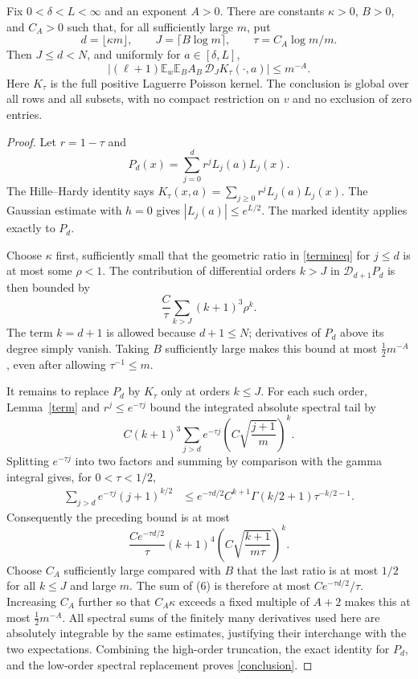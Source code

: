 \documentclass[11pt]{article}
\newcommand{\E}{\mathbb E}
\begin{document}
\begin{theorem}\label{truncation}
Fix $0<\delta<L<\infty$ and an exponent $A>0$.
There are constants $\kappa>0$, $B>0$, and $C_A>0$ such that,
for all sufficiently large $m$, put
\[
 d=\lfloor\kappa m\rfloor,\qquad
 J=\lceil B\log m\rceil,\qquad
 \tau=C_A\log m/m.
\]
Then $J\le d<N$, and uniformly for $a\in[\delta,L]$,
\begin{equation}\label{conclusion}
 \left|(\ell+1)\E_w\E_B A_B\,
          \mathcal D_J K_\tau(\cdot,a)\right|\le m^{-A}.
\end{equation}
Here $K_\tau$ is the full positive Laguerre Poisson kernel. The
conclusion is global over all rows and all subsets, with no compact
restriction on $v$ and no exclusion of zero entries.
\end{theorem}
\begin{proof}
Let $r=1-\tau$ and
\[
 P_d(x)=\sum_{j=0}^d r^jL_j(a)L_j(x).
\]
The Hille--Hardy identity says
$K_\tau(x,a)=\sum_{j\ge0}r^jL_j(a)L_j(x)$.
The Gaussian estimate with $h=0$ gives $|L_j(a)|\le e^{L/2}$.
The marked identity applies exactly to $P_d$.

Choose $\kappa$ first, sufficiently small that the geometric ratio
in \eqref{termineq} for $j\le d$ is at most some $\rho<1$.
The contribution of differential orders $k>J$ in
$\mathcal D_{d+1}P_d$ is then bounded by
\[
 \frac C\tau\sum_{k>J}(k+1)^3\rho^k.
\]
The term $k=d+1$ is allowed because $d+1\le N$; derivatives of
$P_d$ above its degree simply vanish. Taking $B$ sufficiently large
makes this bound at most $\tfrac12m^{-A}$, even after allowing
$\tau^{-1}\le m$.

It remains to replace $P_d$ by $K_\tau$ only at orders $k\le J$.
For each such order, Lemma~\ref{term} and $r^j\le e^{-\tau j}$
bound the integrated absolute spectral tail by
\[
 C(k+1)^3\sum_{j>d}e^{-\tau j}
                   \left(C\sqrt{\frac{j+1}{m}}\right)^k.
\]
Splitting $e^{-\tau j}$ into two factors and summing by comparison
with the gamma integral gives, for $0<\tau<1/2$,
\begin{align*}
 \sum_{j>d}e^{-\tau j}(j+1)^{k/2}
 &\le e^{-\tau d/2}C^{k+1}
               \Gamma(k/2+1)\tau^{-k/2-1}.
\end{align*}
Consequently the preceding bound is at most
\[
 \frac{Ce^{-\tau d/2}}\tau (k+1)^4
       \left(C\sqrt{\frac{k+1}{m\tau}}\right)^k.          \tag{6}
\]
Choose $C_A$ sufficiently large compared with $B$ that the last ratio
is at most $1/2$ for all $k\le J$ and large $m$.
The sum of (6) is therefore at most $Ce^{-\tau d/2}/\tau$.
Increasing $C_A$ further so that $C_A\kappa$ exceeds a fixed multiple
of $A+2$ makes this at most $\tfrac12m^{-A}$.
All spectral sums of the finitely many derivatives used here are
absolutely integrable by the same estimates, justifying their
interchange with the two expectations.
Combining the high-order truncation, the exact identity for $P_d$,
and the low-order spectral replacement proves \eqref{conclusion}.
\end{proof}
\end{document}
